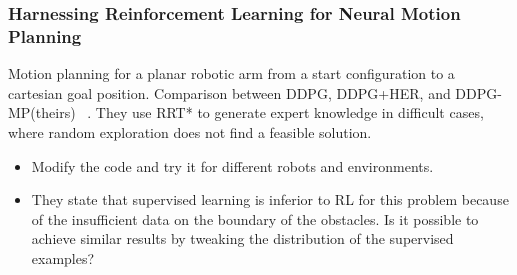 \documentclass[a4paper]{article}
\begin{document}
\subsubsection{Harnessing Reinforcement Learning for Neural Motion Planning}
Motion planning for a planar robotic arm from a start configuration to a cartesian goal position. Comparison between DDPG, DDPG+HER, and DDPG-MP(theirs) ~\cite{Jurgenson2019}.
They use RRT* to generate expert knowledge in difficult cases, where random exploration does not find a feasible solution.
\begin{itemize}
    \item Modify the code and try it for different robots and environments.
    \item They state that supervised learning is inferior to RL for this problem because of the insufficient data on the boundary of the obstacles. Is it possible to achieve similar results by tweaking the distribution of the supervised examples?
\end{itemize}



\end{document}
